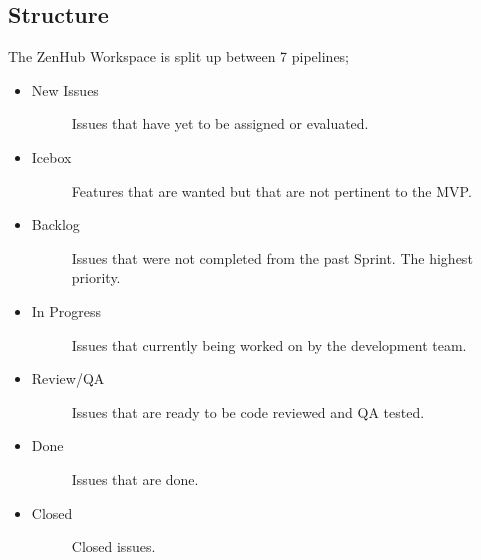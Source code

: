 \documentclass[letterpaper,10pt,english]{sphinxmanual}
\begin{document}
\subsection{Structure}
\label{\detokenize{test_plan/issue_management:structure}}
The ZenHub Workspace is split up between 7 pipelines;
\begin{itemize}
\item {} \begin{description}
\item[{New Issues}] \leavevmode
Issues that have yet to be assigned or evaluated.

\end{description}

\item {} \begin{description}
\item[{Icebox}] \leavevmode
Features that are wanted but that are not pertinent to the MVP.

\end{description}

\item {} \begin{description}
\item[{Backlog}] \leavevmode
Issues that were not completed from the past Sprint. The highest priority.

\end{description}

\item {} \begin{description}
\item[{In Progress}] \leavevmode
Issues that currently being worked on by the development team.

\end{description}

\item {} \begin{description}
\item[{Review/QA}] \leavevmode
Issues that are ready to be code reviewed and QA tested.

\end{description}

\item {} \begin{description}
\item[{Done}] \leavevmode
Issues that are done.

\end{description}

\item {} \begin{description}
\item[{Closed}] \leavevmode
Closed issues.

\end{description}

\end{itemize}
\end{document}

